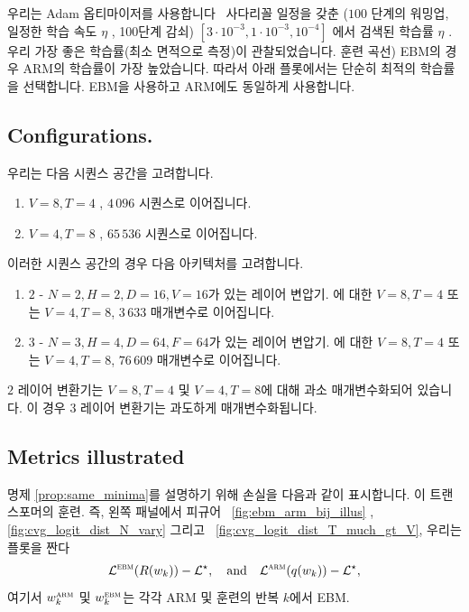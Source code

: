 \documentclass{article}
\def\cL{{\mathcal{L}}}
\def\arm{{\textsc{arm}}}
\def\ebm{{\textsc{ebm}}}
\begin{document}
우리는 Adam 옵티마이저를 사용합니다~ 사다리꼴 일정을 갖춘 \citep{kingma2014adam}
($100$ 단계의 워밍업, 일정한 학습 속도 $\eta$ , 100단계 감쇠)
$[3\cdot10^{-3}, 1\cdot10^{-3}, 10^{-4}]$ 에서 검색된 학습률 $\eta$ . 우리
가장 좋은 학습률(최소 면적으로 측정)이 관찰되었습니다.
훈련 곡선) EBM의 경우 ARM의 학습률이 가장 높았습니다.
따라서 아래 플롯에서는 단순히 최적의 학습률을 선택합니다.
EBM을 사용하고 ARM에도 동일하게 사용합니다.

\subsection{Configurations.} 
우리는 다음 시퀀스 공간을 고려합니다.
 \begin{enumerate}[nosep]
     \item $V=8, T=4$ , $4\,096$ 시퀀스로 이어집니다.
     \item $V=4, T=8$ , $65\,536$ 시퀀스로 이어집니다.
 \end{enumerate}

이러한 시퀀스 공간의 경우 다음 아키텍처를 고려합니다. 
 \begin{enumerate}[nosep]
     \item $2$ - $N=2, H=2, D=16, V=16$가 있는 레이어 변압기.
                에 대한  
                 $V=8, T=4$  
                또는 
                 $V=4, T=8$,
                $3\,633$ 매개변수로 이어집니다.
     \item $3$ - $N=3, H=4, D=64, F=64$가 있는 레이어 변압기.
                에 대한  
                 $V=8, T=4$  
                또는 
                 $V=4, T=8$,
                $76\,609$ 매개변수로 이어집니다.
 \end{enumerate}


$2$ 레이어 변환기는 $V=8, T=4$ 및 $V=4, T=8$에 대해 과소 매개변수화되어 있습니다.
이 경우 $3$ 레이어 변환기는 과도하게 매개변수화됩니다.

\subsection{Metrics illustrated}

명제 \ref{prop:same_minima}를 설명하기 위해 손실을 다음과 같이 표시합니다.
이 트랜스포머의 훈련. 즉, 왼쪽 패널에서
피규어~ \ref{fig:ebm_arm_bij_illus} ,~ \ref{fig:cvg_logit_dist_N_vary} 
그리고~ \ref{fig:cvg_logit_dist_T_much_gt_V}, 우리는 플롯을 짠다 
\[
 \cL ^ \ebm (R(w_k)) - \cL ^ \star , \quad \text{and} \quad \cL ^ \arm (q(w_k)) - \cL ^ \star ,
\]
여기서 $w_k^\arm$ 및 $w_k^\ebm$는 각각 ARM 및
훈련의 반복 $k$에서 EBM.
\end{document}
